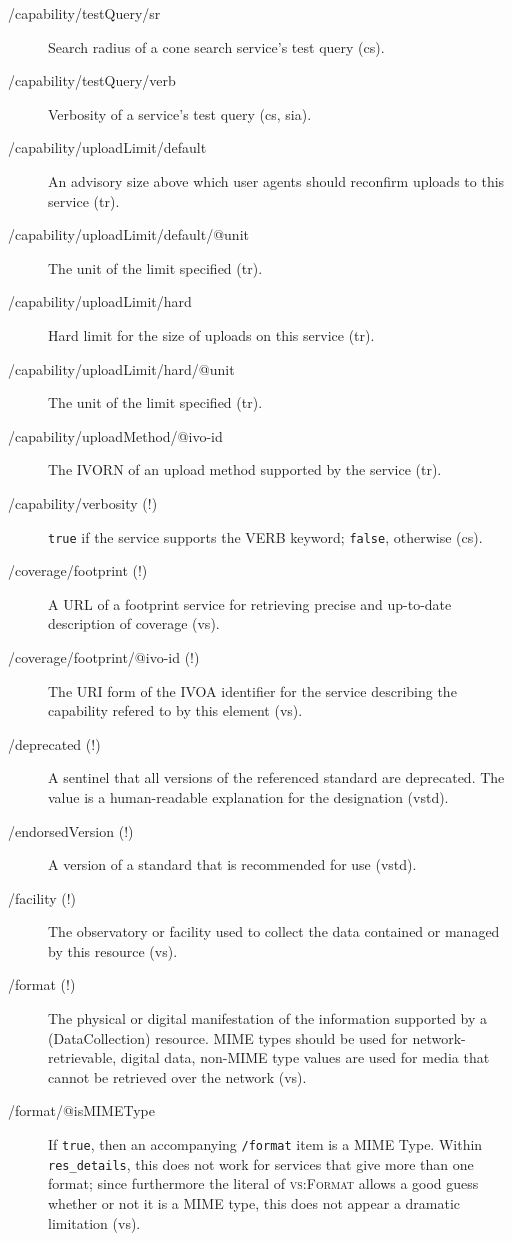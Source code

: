 \documentclass[11pt,a4paper]{ivoa}
\newcommand{\rtent}[1]{\texttt{\color{rtcolor} #1}}
\newcommand{\vorent}[1]{\textsc{#1}}
\begin{document}
\begin{description}
\item[/capability/testQuery/sr]Search radius of a cone search service's test query (cs).
\item[/capability/testQuery/verb]Verbosity of a service's test query (cs, sia).
\item[/capability/uploadLimit/default]An advisory size above which user agents should reconfirm uploads to this service (tr).
\item[/capability/uploadLimit/default/@unit]The unit of the limit specified (tr).
\item[/capability/uploadLimit/hard]Hard limit for the size of uploads on this service (tr).
\item[/capability/uploadLimit/hard/@unit]The unit of the limit specified (tr).
\item[/capability/uploadMethod/@ivo-id]The IVORN of an upload method supported by the service (tr).
\item[/capability/verbosity (!)]\texttt{true} if the service supports the VERB keyword; \texttt{false}, otherwise (cs).
\item[/coverage/footprint (!)]A URL of a footprint service for retrieving precise and up-to-date description of coverage (vs).
\item[/coverage/footprint/@ivo-id (!)]The URI form of the IVOA identifier for the service describing the capability refered to by this element (vs).
\item[/deprecated (!)]A sentinel that all versions of the referenced standard are deprecated. The value is a human-readable explanation for the designation (vstd).
\item[/endorsedVersion (!)]A version of a standard that is recommended for use (vstd).
\item[/facility (!)]The observatory or facility used to collect the data contained or managed by this resource (vs).
\item[/format (!)]The physical or digital manifestation of the information supported by a (DataCollection) resource.  MIME types should be used for network-retrievable, digital data, non-MIME type values are used for media that cannot be retrieved over the network (vs).
\item[/format/@isMIMEType]If \texttt{true}, then an accompanying \texttt{/format} item is a MIME Type. Within \rtent{res\_details}, this does not work for services that give more than one format; since furthermore the literal of \vorent{vs:Format} allows a good guess whether or not it is a MIME type, this does not appear a dramatic limitation (vs).

\end{description}
\end{document}
